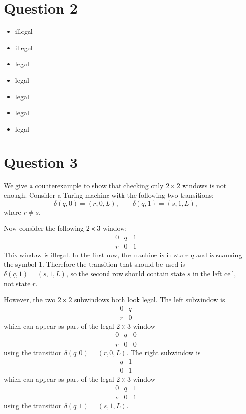 \documentclass[a4paper, UTF-8]{article}
\theoremstyle{plain}
\begin{document}
\section{Question 2}
 
\begin{itemize} 
  \item[a.] illegal 
  \item[b.] illegal 
  \item[c.] legal 
  \item[d.] legal 
  \item[e.] legal 
  \item[f.] legal 
  \item[g.] legal 
\end{itemize} 

\section{Question 3} 

We give a counterexample to show that checking only $2\times 2$ windows is not
enough. Consider a Turing machine with the following two transitions:
\[
\delta(q,0)=(r,0,L), \qquad \delta(q,1)=(s,1,L),
\]
where $r\neq s$.

Now consider the following $2\times 3$ window:
\[
\begin{array}{ccc}
0 & q & 1\\
r & 0 & 1
\end{array}
\]
This window is illegal. In the first row, the machine is in state $q$ and is
scanning the symbol $1$. Therefore the transition that should be used is
$\delta(q,1)=(s,1,L)$, so the second row should contain state $s$ in the left
cell, not state $r$.

However, the two $2\times 2$ subwindows both look legal. The left subwindow is
\[
\begin{array}{cc}
0 & q\\
r & 0
\end{array}
\]
which can appear as part of the legal $2\times 3$ window
\[
\begin{array}{ccc}
0 & q & 0\\
r & 0 & 0
\end{array}
\]
using the transition $\delta(q,0)=(r,0,L)$. The right subwindow is
\[
\begin{array}{cc}
q & 1\\
0 & 1
\end{array}
\]
which can appear as part of the legal $2\times 3$ window
\[
\begin{array}{ccc}
0 & q & 1\\
s & 0 & 1
\end{array}
\]
using the transition $\delta(q,1)=(s,1,L)$.
\end{document}
